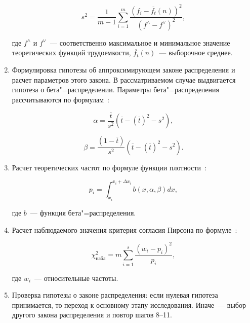 \documentclass[a4paper, article, 12pt]{extarticle}
\begin{document}
\begin{enumerate}
	\begin{equation}\label{eq:variance}
		s^2 = \frac{1}{m - 1} \sum_{i=1}^{m}{\frac{(f_i - \overline{f_t}(n))^2}{(f^\wedge - f^\vee)^2}},
	\end{equation}

	где $f^\wedge$ и $f^\vee$~--- соответственно максимальное и минимальное значение теоретических функций трудоемкости, $\overline{f_t}(n)$~--- выборочное среднее.
	
	\item Формулировка гипотезы об аппроксимирующем законе распределения и расчет параметров этого закона. В рассматриваемом случае выдвигается гипотеза о бета"=распределении. Параметры бета"=распределения рассчитываются по формулам~\cite{petrushyn_ulyanov_planning}:

	\begin{equation}\label{eq:alpha}
		\alpha = \frac{\overline{t}}{s^2} (\overline{t} - (\overline{t})^2 - s^2),
	\end{equation}

	\begin{equation}\label{eq:beta}
		\beta = \frac{(1 - \overline{t})}{s^2} (\overline{t} - (\overline{t})^2 - s^2).
	\end{equation}

	\item Расчет теоретических частот по формуле функции плотности~\cite{petrushyn_ulyanov_planning}:

	\begin{equation}\label{eq:frequency}
		p_i = \int_{x_i}^{x_i + \Delta x_i}{b(x, \alpha, \beta) dx},
	\end{equation}

	где $b$~--- функция бета"=распределения.

	\item Расчет наблюдаемого значения критерия согласия Пирсона по формуле~\cite{koroluk}:
	
	\begin{equation}\label{eq:pirson_criteria_concrete}
		\chi_{\text{набл}}^2 = m \sum_{i=1}^{s} \frac{(w_i - p_i)^2}{p_i},
	\end{equation}

	где $w_i$~--- относительные частоты.

	\item Проверка гипотезы о законе распределения: если нулевая гипотеза принимается, то переход к основному этапу исследования. Иначе~--- выбор другого закона распределения и повтор шагов 8--11.
\end{enumerate}
\end{document}
